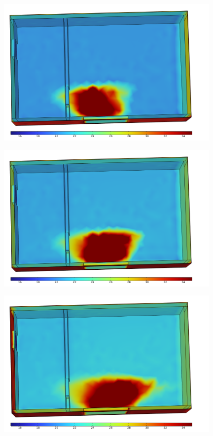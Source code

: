 \documentclass[14pt,aspectratio=169,hyperref={pdftex,unicode},xcolor=dvipsnames]{beamer}
\begin{document}
\begin{frame} \begin{center}
\includegraphics[width=11cm]{images/solar_radiation/solar_4.png}
\end{center} \end{frame}
\begin{frame} \begin{center}
\includegraphics[width=11cm]{images/solar_radiation/solar_5.png}
\end{center} \end{frame}
\begin{frame} \begin{center}
\includegraphics[width=11cm]{images/solar_radiation/solar_6.png}
\end{center} \end{frame}
\end{document}
